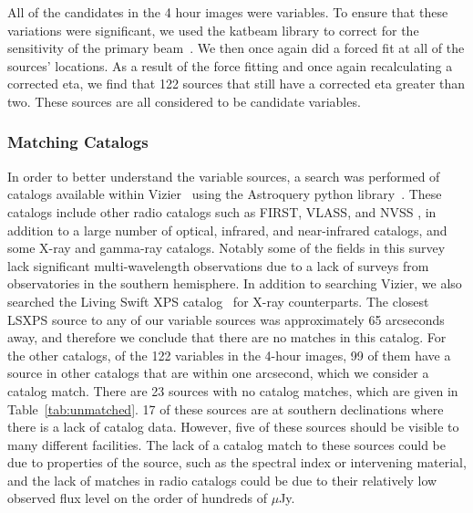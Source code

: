 \documentclass[12pt]{article}
\begin{document}
All of the candidates in the 4 hour images were variables. To ensure that these variations were significant, we used the katbeam library to correct for the sensitivity of the primary beam~\citep{2022AJ....163..135D}. We then once again did a forced fit at all of the sources' locations. As a result of the force fitting and once again recalculating a corrected eta, we find that 122 sources that still have a corrected eta greater than two. These sources are all considered to be candidate variables. 
\subsubsection{Matching Catalogs}
\label{sec:MatchingCatalogs}
In order to better understand the variable sources, a search was performed of catalogs available within Vizier~\citep[]{vizier} using the Astroquery python library~\citep{2019AJ....157...98G}. These catalogs include other radio catalogs such as FIRST, VLASS,  and NVSS \citep{2015ApJ...801...26H,2021ApJS..255...30G,1998AJ....115.1693C}, in addition to a large number of optical, infrared, and near-infrared catalogs, and some X-ray and gamma-ray catalogs. Notably some of the fields in this survey lack significant multi-wavelength observations due to a lack of surveys from observatories in the southern hemisphere. In addition to searching Vizier, we also searched the Living Swift XPS catalog~\citep{2022MNRAS.tmp.2790E} for X-ray counterparts. The closest LSXPS source to any of our variable sources was approximately 65 arcseconds away, and therefore we conclude that there are no matches in this catalog. For the other catalogs, of the 122 variables in the 4-hour images, 99 of them have a source in other catalogs that are within one arcsecond, which we consider a catalog match. There are 23 sources with no catalog matches, which are given in Table~\ref{tab:unmatched}. 17 of these sources are at southern declinations where there is a lack of catalog data. However, five of these sources should be visible to many different facilities. The lack of a catalog match to these sources could be due to properties of the source, such as the spectral index or intervening material, and the lack of matches in radio catalogs could be due to their relatively low observed flux level on the order of hundreds of $\mu$Jy.
\end{document}
